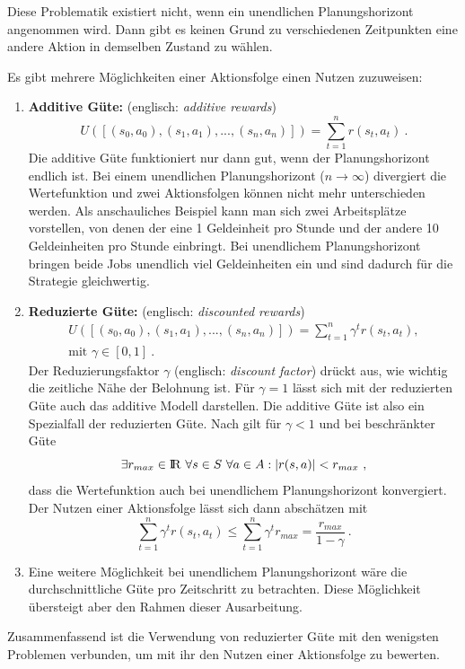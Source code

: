 \documentclass[a4paper]{IEEEtran}
\def\IR{\mathrm{I\hspace{-2pt}R}} %
\begin{document}
Diese Problematik existiert nicht, wenn ein unendlichen Planungshorizont angenommen wird. Dann gibt es keinen Grund zu verschiedenen Zeitpunkten eine andere Aktion in demselben Zustand zu wählen.

Es gibt mehrere Möglichkeiten einer Aktionsfolge einen Nutzen zuzuweisen:
\begin{enumerate}
	\item \textbf{Additive Güte:} (englisch: \emph{additive rewards})
		\begin{equation}
			U([ (s_0, a_0), (s_1, a_1), ..., (s_n, a_n)]) = \sum\limits_{t=1}^n r(s_t, a_t)\ .
		\end{equation}
		Die additive Güte funktioniert nur dann gut, wenn der Planungshorizont endlich ist. Bei einem unendlichen Planungshorizont ($n \rightarrow \infty$) divergiert die Wertefunktion und zwei Aktionsfolgen können nicht mehr unterschieden werden. Als anschauliches Beispiel kann man sich zwei Arbeitsplätze vorstellen, von denen der eine 1 Geldeinheit pro Stunde und der andere 10 Geldeinheiten pro Stunde einbringt. Bei unendlichem Planungshorizont bringen beide Jobs unendlich viel Geldeinheiten ein und sind dadurch für die Strategie gleichwertig.
	\item \textbf{Reduzierte Güte:} (englisch: \emph{discounted rewards})
		\begin{equation}
			\begin{split}
				U([ (s_0, a_0), (s_1, a_1), ..., (s_n, a_n)]) = \sum\limits_{t=1}^n \gamma^t r(s_t, a_t),\\
				\text{mit }\gamma \in [0,1]\ .
			\end{split}
		\end{equation}
		Der Reduzierungsfaktor $\gamma$ (englisch: \emph{discount factor}) drückt aus, wie wichtig die zeitliche Nähe der Belohnung ist. Für $\gamma=1$ lässt sich mit der reduzierten Güte auch das additive Modell darstellen. Die additive Güte ist also ein Spezialfall der reduzierten Güte. Nach \cite{thrun2005probabilistic} gilt für $\gamma < 1$ und bei beschränkter Güte 
		\begin{equation}
			\exists r_{max} \in \IR\ \forall s \in S\ \forall a \in A: |r(s,a)| < r_{max} \ ,
		\end{equation}
		dass die Wertefunktion auch bei unendlichem Planungshorizont konvergiert. Der Nutzen einer Aktionsfolge lässt sich dann abschätzen mit  
		\begin{equation}
			\sum\limits_{t=1}^n \gamma^t r(s_t, a_t) \leq \sum\limits_{t=1}^n \gamma^t r_{max} = \frac{r_{max}}{1-\gamma}  \ .
		\end{equation}
	\item
		Eine weitere Möglichkeit bei unendlichem Planungshorizont wäre die durchschnittliche Güte pro Zeitschritt zu betrachten. Diese Möglichkeit übersteigt aber den Rahmen dieser Ausarbeitung.
\end{enumerate}
Zusammenfassend ist die Verwendung von reduzierter Güte mit den wenigsten Problemen verbunden, um mit ihr den Nutzen einer Aktionsfolge zu bewerten.
\end{document}
